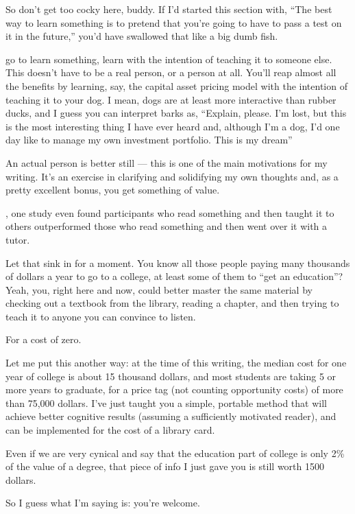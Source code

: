 So don't get too cocky
here, buddy. If I'd started this section with, ``The best way to learn
something is to pretend that you're going to have to pass a test on it
in the future,'' you'd have swallowed that like a big dumb fish.

 go to learn something, learn with the intention
of teaching it to someone else. This doesn't have to be a real person,
or a person at all. You'll reap almost all the benefits by learning,
say, the capital asset pricing model with the intention of teaching it
to your dog. I mean, dogs are at least more interactive than rubber
ducks, and I guess you can interpret barks as, ``Explain, please. I'm lost, but
this is the most interesting thing I have ever heard and, although I'm a dog,
I'd one day like to manage my own investment portfolio. This is my dream''

An actual person is better still --- this is one of the main motivations
for my writing. It's an exercise in clarifying and solidifying my own
thoughts and, as a pretty excellent bonus, you get something of
value.

, one study even found participants who read something and then
taught it to others outperformed those who read something and then went
over it with a tutor.

Let that sink in for a moment. You know all those people paying many
thousands of dollars a year to go to a college, at least some of them to
``get an education''? Yeah, you, right here and now, could better master
the same material by checking out a textbook from the library, reading a
chapter, and then trying to teach it to anyone you can convince to
listen.

For a cost of zero.

Let me put this another way: at the time of this writing, the median
cost for one year of college is about 15 thousand dollars, and most
students are taking 5 or more years to graduate, for a price tag (not
counting opportunity costs) of more than 75,000 dollars. I've just
taught you a simple, portable method that will achieve better cognitive
results (assuming a sufficiently motivated reader), and can be
implemented for the cost of a library card.

Even if we are very cynical and say that the education part of college
is only 2\% of the value of a degree, that piece of info I just gave you
is still worth 1500 dollars.

So I guess what I'm saying is: you're welcome.

